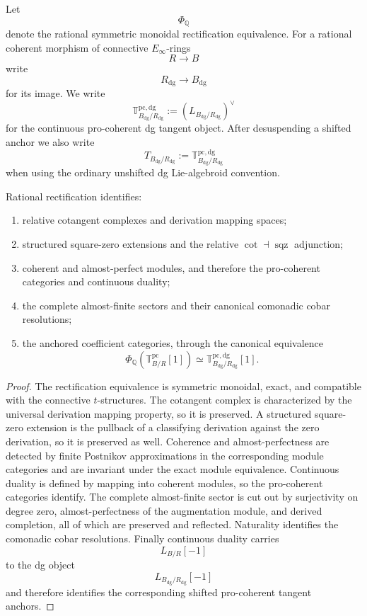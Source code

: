 Let
\[
    \Phi_{\mathbb Q}
\]
denote the rational symmetric monoidal rectification equivalence.  For a
rational coherent morphism of connective $E_\infty$-rings
\[
    R\longrightarrow B
\]
write
\[
    R_{\mathrm{dg}}\longrightarrow B_{\mathrm{dg}}
\]
for its image.  We write
\[
    \mathbb T^{\mathrm{pc,dg}}_{B_{\mathrm{dg}}/R_{\mathrm{dg}}}
    :=
    \left(L_{B_{\mathrm{dg}}/R_{\mathrm{dg}}}\right)^\vee
\]
for the continuous pro-coherent dg tangent object.  After desuspending a
shifted anchor we also write
\[
    T_{B_{\mathrm{dg}}/R_{\mathrm{dg}}}
    :=
    \mathbb T^{\mathrm{pc,dg}}_{B_{\mathrm{dg}}/R_{\mathrm{dg}}}
\]
when using the ordinary unshifted dg Lie-algebroid convention.

\begin{proposition}
\label{prop:bnla-rational-coefficient-rectification}
Rational rectification identifies:
\begin{enumerate}
    \item relative cotangent complexes and derivation mapping spaces;
    \item structured square-zero extensions and the relative
    $\operatorname{cot}\dashv\operatorname{sqz}$ adjunction;
    \item coherent and almost-perfect modules, and therefore the
    pro-coherent categories and continuous duality;
    \item the complete almost-finite sectors and their canonical comonadic
    cobar resolutions;
    \item the anchored coefficient categories, through the canonical
    equivalence
    \[
        \Phi_{\mathbb Q}
        \left(\mathbb T^{\mathrm{pc}}_{B/R}[1]\right)
        \simeq
        \mathbb T^{\mathrm{pc,dg}}_{B_{\mathrm{dg}}/R_{\mathrm{dg}}}[1].
    \]
\end{enumerate}
\end{proposition}

\begin{proof}
The rectification equivalence is symmetric monoidal, exact, and compatible
with the connective $t$-structures.  The cotangent complex is characterized
by the universal derivation mapping property, so it is preserved.  A
structured square-zero extension is the pullback of a classifying derivation
against the zero derivation, so it is preserved as well.  Coherence and
almost-perfectness are detected by finite Postnikov approximations in the
corresponding module categories and are invariant under the exact module
equivalence.  Continuous duality is defined by mapping into coherent modules,
so the pro-coherent categories identify.  The complete almost-finite sector
is cut out by surjectivity on degree zero, almost-perfectness of the
augmentation module, and derived completion, all of which are preserved and
reflected.  Naturality identifies the comonadic cobar resolutions.  Finally
continuous duality carries
\[
    L_{B/R}[-1]
\]
to the dg object
\[
    L_{B_{\mathrm{dg}}/R_{\mathrm{dg}}}[-1]
\]
and therefore identifies the corresponding shifted pro-coherent tangent
anchors.
\end{proof}

